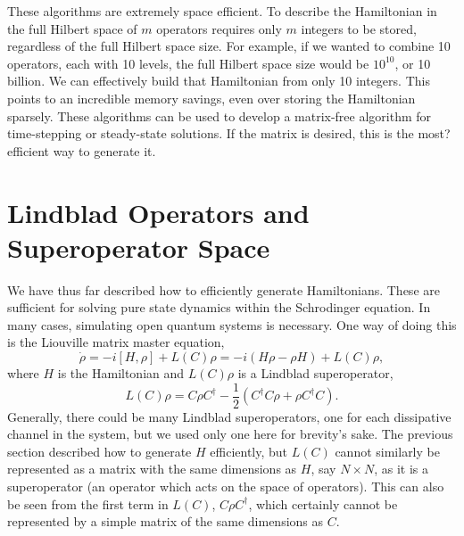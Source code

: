 \documentclass{article}
\begin{document}
These algorithms are extremely space efficient. To describe the Hamiltonian in the full Hilbert
space of $m$ operators requires only $m$ integers to be stored, regardless of the full Hilbert
space size. For example, if we wanted to combine 10 operators, each with 10 levels, the
full Hilbert space size would be $10^{10}$, or 10 billion. We can effectively build that
Hamiltonian from only 10 integers. This points to an incredible memory savings, even
over storing the Hamiltonian sparsely. These algorithms can be used to develop a
matrix-free algorithm for time-stepping or steady-state solutions. If the matrix
is desired, this is the most? efficient way to generate it.

\section{Lindblad Operators and Superoperator Space}
We have thus far described how to efficiently generate Hamiltonians. These are sufficient for
solving pure state dynamics within the Schrodinger equation. In many cases, simulating
open quantum systems is necessary. One way of doing this is the Liouville matrix master equation,
\begin{equation}\label{dmmaster}
\dot{\rho} = -i [H,\rho] + L(C)\rho= -i (H\rho - \rho H) + L(C)\rho,
\end{equation}
where $H$ is the Hamiltonian and $L(C)\rho$ is a Lindblad superoperator,
\begin{equation}\label{lindblad}
L(C)\rho = C\rho C^\dagger - \frac{1}{2}(C^\dagger C \rho + \rho C^\dagger C).
\end{equation}
Generally, there could be many Lindblad superoperators, one for each dissipative channel
in the system, but we used only one here for brevity's sake. The previous section described
how to generate $H$ efficiently, but $L(C)$ cannot similarly be represented as a matrix with
the same dimensions as $H$, say $N\times N$, as it is a superoperator
(an operator which acts on the space
of operators). This can also be seen from the first term in $L(C)$, $C\rho C^\dagger$, which
certainly cannot be represented by a simple matrix of the same dimensions as $C$.
\end{document}
